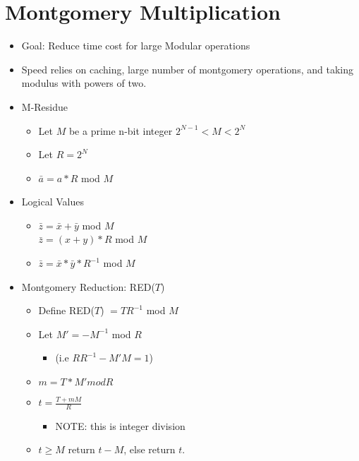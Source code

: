 \section{Montgomery Multiplication}
\begin{itemize}
\item Goal: Reduce time cost for large Modular operations
\item Speed relies on caching, large number of montgomery operations, and taking modulus with powers of two. 
\item M-Residue
    \begin{itemize}
    \item Let $M$ be a prime n-bit integer $2^{N-1} < M < 2^N$
    \item Let $R = 2^N$
    \item $\bar{a} = a*R$ mod $M$
    \end{itemize}
\item Logical Values
    \begin{itemize}
    \item $\bar{z} = \bar{x} + \bar{y}$ mod $M$
        \\$\bar{z} = (x+y)*R$ mod $M$
    \item $\bar{z} = \bar{x}*\bar{y}*R^{-1}$ mod $M$
    \end{itemize}
\item Montgomery Reduction: RED($T$)
    \begin{itemize}
    \item Define RED($T$) $= TR^{-1}$ mod $M$
    \item Let $M' = -M^{-1}$ mod $R$
        \begin{itemize}
        \item (i.e $RR^{-1} - M'M = 1$)
        \end{itemize}
    \item $m = T*M' mod R$
    \item $t = \frac{T+mM}{R}$
        \begin{itemize}
        \item NOTE: this is integer division
        \end{itemize}
    \item $t \ge M$ return $t-M$, else return $t$.
    \end{itemize}
\end{itemize}